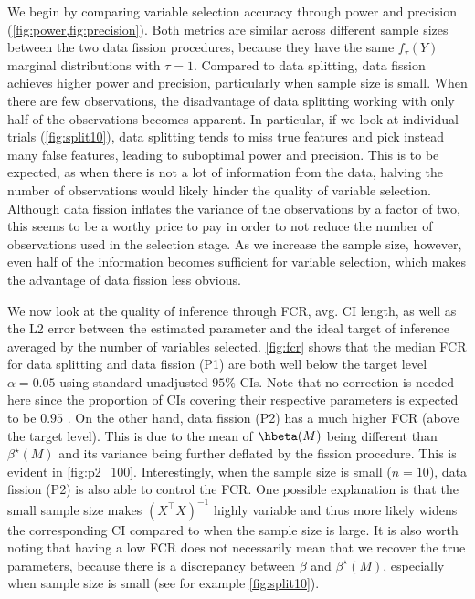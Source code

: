 We begin by comparing variable selection accuracy through power and precision (\cref{fig:power,fig:precision}). Both metrics are similar across different sample sizes between the two data fission procedures, because they have the same $f_\tau(Y)$ marginal distributions with $\tau=1$. Compared to data splitting, data fission achieves higher power and precision, particularly when sample size is small. When there are few observations, the disadvantage of data splitting working with only half of the observations becomes apparent. In particular, if we look at individual trials (\cref{fig:split10}), data splitting tends to miss true features and pick instead many false features, leading to suboptimal power and precision. This is to be expected, as when there is not a lot of information from the data, halving the number of observations would likely hinder the quality of variable selection. Although data fission inflates the variance of the observations by a factor of two, this seems to be a worthy price to pay in order to not reduce the number of observations used in the selection stage. As we increase the sample size, however, even half of the information becomes sufficient for variable selection, which makes the advantage of data fission less obvious.

We now look at the quality of inference through FCR, avg. CI length, as well as the L2 error between the estimated parameter and the ideal target of inference averaged by the number of variables selected. \cref{fig:fcr} shows that the median FCR for data splitting and data fission (P1) are both well below the target level $\alpha = 0.05$ using standard unadjusted $95\%$ CIs. Note that no correction is needed here since the proportion of CIs covering their respective parameters is expected to be $0.95$ \citep{benjamini2005false}. On the other hand, data fission (P2) has a much higher FCR (above the target level). This is due to the mean of $\hbeta(M)$ being different than $\beta^\star(M)$ and its variance being further deflated by the fission procedure. This is evident in \cref{fig:p2_100}. Interestingly, when the sample size is small ($n=10$), data fission (P2) is also able to control the FCR. One possible explanation is that the small sample size makes $(X^\top X)^{-1}$ highly variable and thus more likely widens the corresponding CI compared to when the sample size is large. It is also worth noting that having a low FCR does not necessarily mean that we recover the true parameters, because there is a discrepancy between $\beta$ and $\beta^\star(M)$, especially when sample size is small (see for example \cref{fig:split10}).

